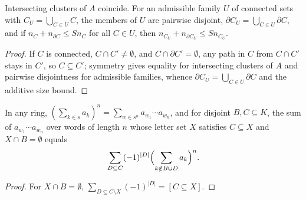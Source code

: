 \begin{lemma}
    \label{thm:hastings_clusters_meet}
    \leanok
    Intersecting clusters of $A$ coincide. For an admissible family $U$ of
    connected sets with $C_U=\bigcup_{C\in U}C$, the members of $U$ are pairwise
    disjoint, $\partial C_U=\bigcup_{C\in U}\partial C$, and if
    $n_C+n_{\partial C}\le Sn_C$ for all $C\in U$, then
    $n_{C_U}+n_{\partial C_U}\le Sn_{C_U}$.
\end{lemma}
\begin{proof}
    \leanok
    If $C$ is connected, $C\cap C'\ne\emptyset$, and $C\cap\partial C'=\emptyset$,
    any path in $C$ from $C\cap C'$ stays in $C'$, so $C\subseteq C'$; symmetry
    gives equality for intersecting clusters of $A$ and pairwise disjointness for
    admissible families, whence $\partial C_U=\bigcup_{C\in U}\partial C$ and
    the additive size bound.
\end{proof}

\begin{lemma}
    \label{thm:hastings_words_inclusion_exclusion}
    \leanok
    In any ring, $(\sum_{k\in s}a_k)^n=\sum_{w\in s^n}a_{w_1}\cdots a_{w_n}$,
    and for disjoint $B,C\subseteq K$, the sum of $a_{w_1}\cdots a_{w_n}$ over
    words of length $n$ whose letter set $X$ satisfies $C\subseteq X$ and
    $X\cap B=\emptyset$ equals
    \begin{align}
        \sum_{D\subseteq C}(-1)^{|D|}\Bigl(\sum_{k\notin B\cup D}a_k\Bigr)^n.
        \label{eq:hastings_words_inclusion_exclusion}
    \end{align}
\end{lemma}
\begin{proof}
    \leanok
    For $X\cap B=\emptyset$,
    $\sum_{D\subseteq C\setminus X}(-1)^{|D|}=[C\subseteq X]$.
\end{proof}


